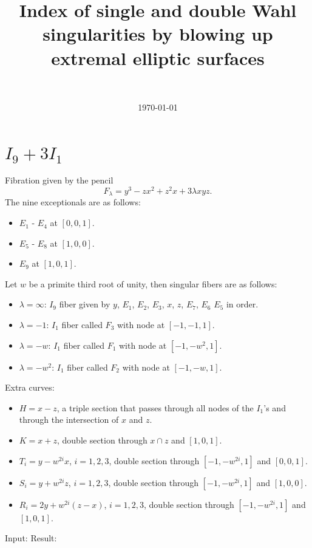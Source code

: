 \documentclass{article}
\title{Index of single and double Wahl singularities by blowing up extremal elliptic surfaces}
\author{\ }
\date{\today}
\begin{document}
\maketitle

\tableofcontents

\section{$I_9 + 3I_1$}
Fibration given by the pencil
\[F_{\lambda} = y^3 - zx^2 + z^2x + 3\lambda xyz.\]
The nine exceptionals are as follows:
\begin{itemize}
  \item $E_1$ - $E_4$ at $[0,0,1]$.
  \item $E_5$ - $E_8$ at $[1,0,0]$.
  \item $E_9$ at $[1,0,1]$.
\end{itemize}
Let $w$ be a primite third root of unity, then singular fibers are as follows:
\begin{itemize}
  \item $\lambda = \infty$: $I_9$ fiber given by $y$, $E_1$, $E_2$, $E_3$, $x$, $z$, $E_7$, $E_6$ $E_5$ in order.
  \item $\lambda = -1$: $I_1$ fiber called $F_3$ with node at $[-1,-1,1]$.
  \item $\lambda = -w$: $I_1$ fiber called $F_1$ with node at $[-1,-w^2,1]$.
  \item $\lambda = -w^2$: $I_1$ fiber called $F_2$ with node at $[-1,-w,1]$.
\end{itemize}
Extra curves:
\begin{itemize}
  \item $H = x-z$, a triple section that passes through all nodes of the $I_1$'s and through the intersection of $x$ and $z$.
  \item $K = x+z$, double section through $x \cap z$ and $[1,0,1]$.
  \item $T_i = y - w^{2i}x$, $i=1,2,3$, double section through $[-1,-w^{2i},1]$ and $[0,0,1]$.
  \item $S_i = y + w^{2i}z$, $i=1,2,3$, double section through $[-1,-w^{2i},1]$ and $[1,0,0]$.
  \item $R_i = 2y + w^{2i}(z-x)$, $i=1,2,3$, double section through $[-1,-w^{2i},1]$ and $[1,0,1]$.
\end{itemize}
Input:
%
Result:
%
\end{document}
